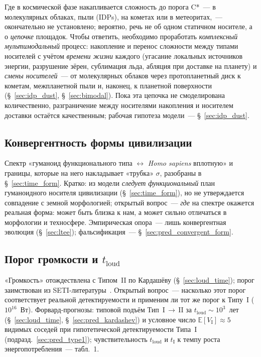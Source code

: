 \documentclass[12pt,a4paper]{article}
\begin{document}
Где в космической фазе накапливается сложность до порога C*~--- в молекулярных облаках, пыли (IDPs), на кометах или в метеоритах,~--- окончательно не установлено; вероятно, речь не об одном статичном носителе, а о \emph{цепочке} площадок. Чтобы ответить, необходимо проработать \emph{комплексный мультимодальный} процесс: накопление и перенос сложности между типами носителей с учётом \emph{времени жизни} каждого (угасание локальных источников энергии, разрушение зёрен, сублимация льда, абляция при доставке на планету) и \emph{смены носителей}~--- от молекулярных облаков через протопланетный диск к кометам, межпланетной пыли и, наконец, к планетной поверхности (\S~\ref{sec:idp_dust}, \S~\ref{sec:bimodal}). Пока эта цепочка не смоделирована количественно, разграничение между носителями накопления и носителем доставки остаётся качественным; рабочая гипотеза модели~--- \S~\ref{sec:idp_dust}.

\subsection{Конвергентность формы цивилизации}
\label{sec:open_civ_form}

Спектр «гуманоид функционального типа $\leftrightarrow$ \emph{Homo sapiens} вплотную» и границы, которые на него накладывает «трубка» $\sigma$, разобраны в \S~\ref{sec:time_form}. Кратко: из модели \emph{следует} \emph{функциональный} план гуманоидного носителя цивилизации (\S~\ref{sec:time_form}), но не утверждается совпадение с земной морфологией; открытый вопрос~--- \emph{где} на спектре окажется реальная форма: может быть близка к нам, а может сильно отличаться в морфологии и техносфере. Эмпирическая опора~--- лишь конвергентная эволюция (\S~\ref{sec:ltee}); фальсификация~--- \S~\ref{sec:pred_convergent_form}.

\subsection{Порог громкости и \texorpdfstring{$t_{\mathrm{loud}}$}{t\_loud}}
\label{sec:open_loud}

«Громкость» отождествлена с Типом~II по Кардашёву (\S~\ref{sec:loud_time}); порог заимствован из SETI-литературы~\cite{Wright2014,Hanson2021}. Открытый вопрос~--- насколько этот порог соответствует реальной детектируемости и применим ли тот же порог к Типу~I ($10^{16}$~Вт). Форвард-прогнозы: типовой подъём Тип~I\,$\to$\,II за $t_{\mathrm{loud}} \sim 10^3$~лет (\S~\ref{sec:loud_time}, \S~\ref{sec:pred_kardashev}) и условное число $\mathbb{E}[V_{\mathrm{I}}] \approx 5$ видимых соседей при гипотетической детектируемости Типа~I (подразд.~\ref{sec:pred_type1}); чувствительность $t_{\mathrm{loud}}$ и $t_{\mathrm{I}}$ к темпу роста энергопотребления~--- табл.~1.
\end{document}
